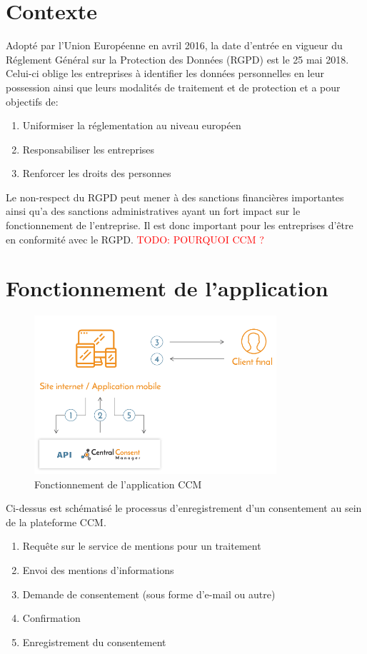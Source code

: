 \documentclass[12pt, a4paper]{report}
\makeatletter
\newcommand\tab[1][1cm]{\hspace*{#1}}
\newcommand\TODO[1]{\textcolor{red}{TODO\@: #1}}
\makeatother
\begin{document}
\section{Contexte}
\tab{} Adopté par l’Union Européenne en avril 2016, la date d’entrée en vigueur du Réglement Général sur la Protection des Données (RGPD) est le 25 mai 2018. Celui-ci oblige les entreprises à identifier les données personnelles en leur possession ainsi que leurs modalités de traitement et de protection et a pour objectifs de\@:
\begin{enumerate}
    \item Uniformiser la réglementation au niveau européen
    \item Responsabiliser les entreprises
    \item Renforcer les droits des personnes
\end{enumerate}
\tab{} Le non-respect du RGPD peut mener à des sanctions financières importantes ainsi qu'a des sanctions administratives ayant un fort impact sur le fonctionnement de l'entreprise.
Il est donc important pour les entreprises d'être en conformité avec le RGPD.\newline
\TODO{POURQUOI CCM ?}

\section{Fonctionnement de l'application}
\begin{figure}[H]
    \begin{center}
        \includegraphics[width=0.8\textwidth]{ccm5.png}
    \end{center}
    \caption{Fonctionnement de l'application CCM}
\end{figure}
Ci-dessus est schématisé le processus d’enregistrement d’un consentement au sein de la plateforme CCM.
\begin{enumerate}
    \item Requête sur le service de mentions pour un traitement
    \item Envoi des mentions d'informations
    \item Demande de consentement (sous forme d'e-mail ou autre)
    \item Confirmation
    \item Enregistrement du consentement
\end{enumerate}
\end{document}
